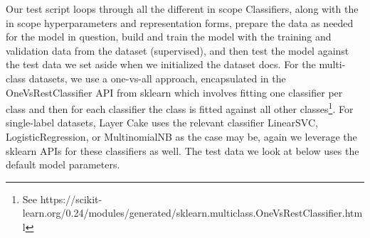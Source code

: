 \documentclass[final]{clv2025}
\begin{document}
Our test script loops through all the different in scope Classifiers, along with the in scope hyperparameters and representation forms, prepare the data as needed for the model in question, build and train the model with the training and validation data from the dataset (supervised), and then test the model against the test data we set aside when we initialized the dataset docs. For the multi-class datasets, we use a one-vs-all approach, encapsulated in the OneVsRestClassifier API from sklearn which involves fitting one classifier per class and then for each classifier the class is fitted against all other classes\footnote{See https://scikit-learn.org/0.24/modules/generated/sklearn.multiclass.OneVsRestClassifier.html}.  For single-label datasets, Layer Cake uses the relevant classifier LinearSVC, LogisticRegression, or MultinomialNB as the case may be, again we leverage the sklearn APIs for these classifiers as well. The test data we look at below uses the default model parameters.
\end{document}
